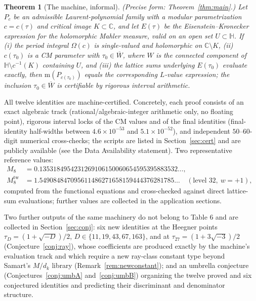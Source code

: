 \documentclass[11pt]{article}
\newcommand{\m}{\mathrm{m}}                 %
\newcommand{\Cc}{\mathbb{C}}
\newcommand{\Hh}{\mathbb{H}}
\newtheorem{theorem}{Theorem}[section]
\theoremstyle{definition}
\theoremstyle{remark}
\begin{document}
\begin{theorem}[The machine, informal]\label{thm:machine}
\textup{(}Precise form: Theorem~\ref{thm:main}.\textup{)}
Let $P_c$ be an admissible Laurent-polynomial family with a modular
parametrization $c=c(\tau)$ and critical image $K\subset\Cc$, and let
$E(\tau)$ be the Eisenstein--Kronecker expression for the holomorphic
Mahler measure, valid on an open set $U\subset\Hh$. If
\textup{(i)} the period integral $\Omega(c)$ is single-valued and
holomorphic on $\Cc\setminus K$, \textup{(ii)} $c(\tau_0)$ is a CM
parameter with $\tau_0\in\overline W$, where $W$ is the connected
component of $\Hh\setminus c^{-1}(K)$ containing $U$, and
\textup{(iii)} the lattice sums underlying $E(\tau_0)$ evaluate
exactly, then $\m(P_{c(\tau_0)})$ equals the corresponding
$L$-value expression; the inclusion $\tau_0\in\overline W$ is
certifiable by rigorous interval arithmetic.
\end{theorem}

All twelve identities are machine-certified. Concretely, each proof
consists of an exact algebraic track (rational/algebraic-integer
arithmetic only, no floating point), rigorous interval locks of the
CM values and of the final identities (final-identity half-widths
between $4.6\times10^{-53}$ and $5.1\times10^{-52}$), and independent
$50$--$60$-digit numerical cross-checks; the scripts are listed in
Section~\ref{sec:cert} and are publicly available
(see the Data Availability statement). Two representative reference
values:
\begin{align*}
  M_8&=0.1353184954231269106150060654595395883532\ldots,\\
  M_8^{\mathrm{tw}}
   &=1.549084847095611486271658159444376281785\ldots
     \quad(\text{level }32,\ w=+1),
\end{align*}
computed from the functional equations and cross-checked against
direct lattice-sum evaluations; further values are collected in the
application sections.

Two further outputs of the same machinery do not belong to Table 6
and are collected in Section~\ref{sec:conj}: six new identities at
the Heegner points $\tau_D=(1+\sqrt{-D})/2$,
$D\in\{11,19,43,67,163\}$, and at $\tau_{27}=(1+3\sqrt{-3})/2$
(Conjecture~\ref{conj:ray}), whose coefficients are produced exactly
by the machine's evaluation track and which require a new ray-class
constant type beyond Samart's $M/d_k$ library
(Remark~\ref{rem:newconstant}); and an umbrella conjecture
(Conjectures~\ref{conj:umbA} and~\ref{conj:umbB}) organizing the
twelve proved and six conjectured identities and predicting their
discriminant and denominator structure.
\end{document}

